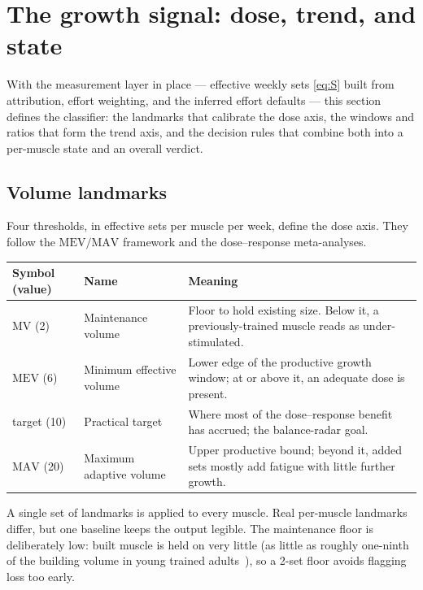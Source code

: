 \documentclass[11pt,a4paper]{article}
\newcommand{\MV}{\mathrm{MV}}
\newcommand{\MEV}{\mathrm{MEV}}
\newcommand{\MAV}{\mathrm{MAV}}
\begin{document}
\section{The growth signal: dose, trend, and state}\label{sec:signal}
With the measurement layer in place --- effective weekly sets \eqref{eq:S} built from attribution, effort weighting, and the inferred effort defaults --- this section defines the classifier: the landmarks that calibrate the dose axis, the windows and ratios that form the trend axis, and the decision rules that combine both into a per-muscle state and an overall verdict.

\subsection{Volume landmarks}
Four thresholds, in effective sets per muscle per week, define the dose axis. They follow the $\MEV/\MAV$ framework and the dose--response meta-analyses.
\begin{center}
\begin{tabular}{@{}llp{7.6cm}@{}}
\toprule
\textbf{Symbol (value)} & \textbf{Name} & \textbf{Meaning}\\
\midrule
$\MV$ (2) & Maintenance volume & Floor to hold existing size. Below it, a previously-trained muscle reads as under-stimulated.\\
$\MEV$ (6) & Minimum effective volume & Lower edge of the productive growth window; at or above it, an adequate dose is present.\\
target (10) & Practical target & Where most of the dose--response benefit has accrued; the balance-radar goal.\\
$\MAV$ (20) & Maximum adaptive volume & Upper productive bound; beyond it, added sets mostly add fatigue with little further growth.\\
\bottomrule
\end{tabular}
\end{center}
A single set of landmarks is applied to every muscle. Real per-muscle landmarks differ, but one baseline keeps the output legible. The maintenance floor is deliberately low: built muscle is held on very little (as little as roughly one-ninth of the building volume in young trained adults~\cite{bickel}), so a 2-set floor avoids flagging loss too early.
\end{document}
